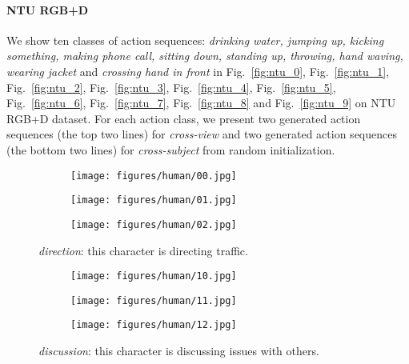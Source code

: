 \documentclass[runningheads]{llncs}
\begin{document}
\paragraph{NTU RGB+D}
We show ten classes of action sequences: \textit{drinking water, jumping up, kicking something, making phone call, sitting down, standing up, throwing, hand waving, wearing jacket} and \textit{crossing hand in front} in Fig.~\ref{fig:ntu_0}, Fig.~\ref{fig:ntu_1}, Fig.~\ref{fig:ntu_2}, Fig.~\ref{fig:ntu_3}, Fig.~\ref{fig:ntu_4}, Fig.~\ref{fig:ntu_5}, Fig.~\ref{fig:ntu_6}, Fig.~\ref{fig:ntu_7}, Fig.~\ref{fig:ntu_8} and Fig.~\ref{fig:ntu_9} on NTU RGB+D dataset. For each action class, we present two generated action sequences (the top two lines) for \textit{cross-view} and two generated action sequences (the bottom two lines) for \textit{cross-subject} from random initialization. 







\begin{figure}[h!]
  \centering
  \begin{subfigure}{0.99\textwidth}
    \texttt{[image: figures/human/00.jpg]}
\end{subfigure}
  \begin{subfigure}{0.99\textwidth}
    \texttt{[image: figures/human/01.jpg]}
\end{subfigure}
  \begin{subfigure}{0.99\textwidth}
    \texttt{[image: figures/human/02.jpg]}
\end{subfigure}
  \caption{\textit{direction}: this character is directing traffic.}
\label{fig:human_0}
\end{figure}



\begin{figure}[h!]
  \centering
  \begin{subfigure}{0.99\textwidth}
    \texttt{[image: figures/human/10.jpg]}
\end{subfigure}
  \begin{subfigure}{0.99\textwidth}
    \texttt{[image: figures/human/11.jpg]}
\end{subfigure}
  \begin{subfigure}{0.99\textwidth}
    \texttt{[image: figures/human/12.jpg]}
\end{subfigure}
  \caption{\textit{discussion}: this character is discussing issues with others.}
  \label{fig:human_1}
\end{figure}
\end{document}
